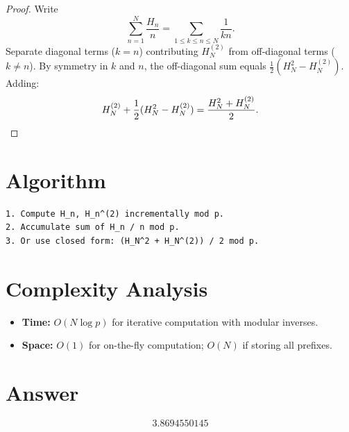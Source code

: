 \documentclass[12pt]{article}
\begin{document}
\begin{proof}
Write
\[
\sum_{n=1}^{N} \frac{H_n}{n} = \sum_{1 \le k \le n \le N} \frac{1}{kn}.
\]
Separate diagonal terms ($k = n$) contributing $H_N^{(2)}$ from off-diagonal terms ($k \ne n$). By symmetry in $k$ and $n$, the off-diagonal sum equals $\frac{1}{2}(H_N^2 - H_N^{(2)})$. Adding:
\[
H_N^{(2)} + \frac{1}{2}(H_N^2 - H_N^{(2)}) = \frac{H_N^2 + H_N^{(2)}}{2}. \qedhere
\]
\end{proof}

\section{Algorithm}
\begin{verbatim}
1. Compute H_n, H_n^(2) incrementally mod p.
2. Accumulate sum of H_n / n mod p.
3. Or use closed form: (H_N^2 + H_N^(2)) / 2 mod p.
\end{verbatim}

\section{Complexity Analysis}
\begin{itemize}
    \item \textbf{Time:} $O(N \log p)$ for iterative computation with modular inverses.
    \item \textbf{Space:} $O(1)$ for on-the-fly computation; $O(N)$ if storing all prefixes.
\end{itemize}

\section{Answer}

\[
\boxed{3.8694550145}
\]
\end{document}
